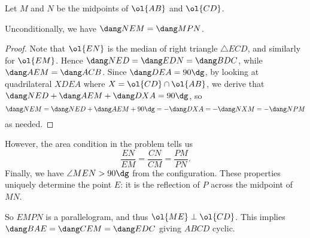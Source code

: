 Let $M$ and $N$ be the midpoints of $\ol{AB}$ and $\ol{CD}$.
\begin{claim*}
  Unconditionally, we have $\dang NEM = \dang MPN$.
\end{claim*}
\begin{proof}
  Note that $\ol{EN}$ is the median of right triangle $\triangle ECD$, and similarly for $\ol{EM}$.
  Hence $\dang NED = \dang EDN = \dang BDC$, while $\dang AEM = \dang ACB$.
  Since $\dang DEA = 90\dg$, by looking at quadrilateral $XDEA$ where $X = \ol{CD} \cap \ol{AB}$,
  we derive that $\dang NED + \dang AEM + \dang DXA = 90\dg$, so
  \[ \dang NEM = \dang NED + \dang AEM + 90\dg = -\dang DXA = -\dang NXM = -\dang NPM \]
  as needed.
\end{proof}

However, the area condition in the problem tells us
\[ \frac{EN}{EM} = \frac{CN}{CM} = \frac{PM}{PN}. \]
Finally, we have $\angle MEN > 90\dg$ from the configuration.
These properties uniquely determine the point $E$:
it is the reflection of $P$ across the midpoint of $MN$.

So $EMPN$ is a parallelogram, and thus $\ol{ME} \perp \ol{CD}$.
This implies $\dang BAE = \dang CEM = \dang EDC$ giving $ABCD$ cyclic.
\pagebreak